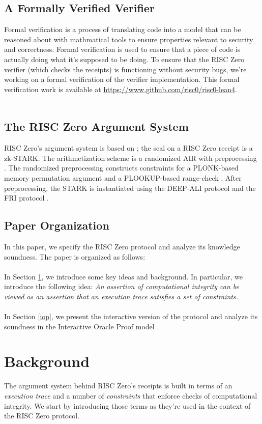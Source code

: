\documentclass[10pt,letterpaper,titlepage]{article}
\theoremstyle{definition}
\begin{document}
\subsection{A Formally Verified Verifier}
Formal verification is a process of translating code into a model that can be reasoned about with mathmatical tools to ensure properties relevant to security and correctness.
Formal verification is used to ensure that a piece of code is actually doing what it's supposed to be doing. 
To ensure that the RISC Zero verifier (which checks the receipts) is functioning without security bugs, we're working on a formal verification of the verifier implementation. 
This formal verification work is available at \url{https://www.github.com/risc0/risc0-lean4}.\\
\\
\subsection{The RISC Zero Argument System}
RISC Zero's argument system is based on \cite{stark}; 
the seal on a RISC Zero receipt is a zk-STARK.
The arithmetization scheme is a randomized AIR with preprocessing \cite{RAP}.
The randomized preprocessing constructs constraints for a PLONK-based memory permutation argument and a PLOOKUP-based range-check \cite{plonk, plookup}.
After preprocessing, the STARK is instantiated using the DEEP-ALI protocol and the FRI protocol \cite{deepFRI, fri}.

\subsection{Paper Organization}
In this paper, we specify the RISC Zero protocol and analyze its knowledge soundness. 
The paper is organized as follows:\\
\\
In Section \ref{background}, we introduce some key ideas and background. 
In particular, we introduce the following idea: 
\textit{An assertion of computational integrity can be viewed as an assertion that an execution trace satisfies a set of constraints.}\\
\\
In Section \ref{iop}, we present the interactive version of the protocol and analyze its soundness in the Interactive Oracle Proof model \cite{iop}. \\
\section{Background}
\label{background}
The argument system behind RISC Zero's receipts is built in terms of an \textit{execution trace} and a number of \textit{constraints} that enforce checks of computational integrity.
We start by introducing those terms as they're used in the context of the RISC Zero protocol.
\end{document}
